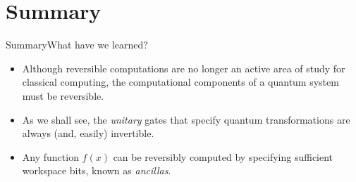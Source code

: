 \section*{Summary}

\begin{frame}{Summary}{What have we learned?}

\begin{itemize}
    \item Although reversible computations are no longer an active area of study for classical computing, the computational components of a quantum system must be reversible.
    \item As we shall see, the \emph{unitary} gates that specify quantum transformations are always (and, easily) invertible.
    \item Any function $f(x)$ can be reversibly computed by specifying sufficient workspace bits, known as \emph{ancillas}.
\end{itemize}
    
\end{frame}